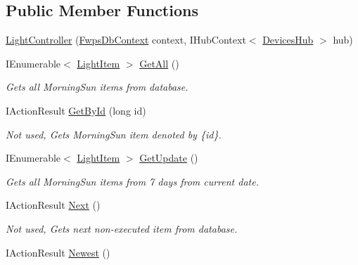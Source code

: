\subsection*{Public Member Functions}
\begin{DoxyCompactItemize}
\item 
\mbox{\hyperlink{class_f_w_p_s_1_1_controllers_1_1_light_controller_a9d6e809f8aa95f22d5ca89d9616d6bf9}{Light\+Controller}} (\mbox{\hyperlink{class_f_w_p_s_1_1_data_1_1_fwps_db_context}{Fwps\+Db\+Context}} context, I\+Hub\+Context$<$ \mbox{\hyperlink{class_f_w_p_s_1_1_devices_hub}{Devices\+Hub}} $>$ hub)
\item 
I\+Enumerable$<$ \mbox{\hyperlink{class_f_w_p_s_1_1_models_1_1_light_item}{Light\+Item}} $>$ \mbox{\hyperlink{class_f_w_p_s_1_1_controllers_1_1_light_controller_a307cd1a97fe0a34495fcf40f7834c3cc}{Get\+All}} ()
\begin{DoxyCompactList}\small\item\em Gets all Morning\+Sun items from database. \end{DoxyCompactList}\item 
I\+Action\+Result \mbox{\hyperlink{class_f_w_p_s_1_1_controllers_1_1_light_controller_a35e585d1b3e493a51f9855f70cca2dc1}{Get\+By\+Id}} (long id)
\begin{DoxyCompactList}\small\item\em Not used, Gets Morning\+Sun item denoted by \{id\}. \end{DoxyCompactList}\item 
I\+Enumerable$<$ \mbox{\hyperlink{class_f_w_p_s_1_1_models_1_1_light_item}{Light\+Item}} $>$ \mbox{\hyperlink{class_f_w_p_s_1_1_controllers_1_1_light_controller_a531d27cca2dfb487ad5120d544cd975d}{Get\+Update}} ()
\begin{DoxyCompactList}\small\item\em Gets all Morning\+Sun items from 7 days from current date. \end{DoxyCompactList}\item 
I\+Action\+Result \mbox{\hyperlink{class_f_w_p_s_1_1_controllers_1_1_light_controller_a65788397f941b3dfb336277e6982541a}{Next}} ()
\begin{DoxyCompactList}\small\item\em Not used, Gets next non-\/executed item from database. \end{DoxyCompactList}\item 
I\+Action\+Result \mbox{\hyperlink{class_f_w_p_s_1_1_controllers_1_1_light_controller_aa3a3e1c2916ef441b88bfb0cf2a525f0}{Newest}} ()

\end{DoxyCompactItemize}
